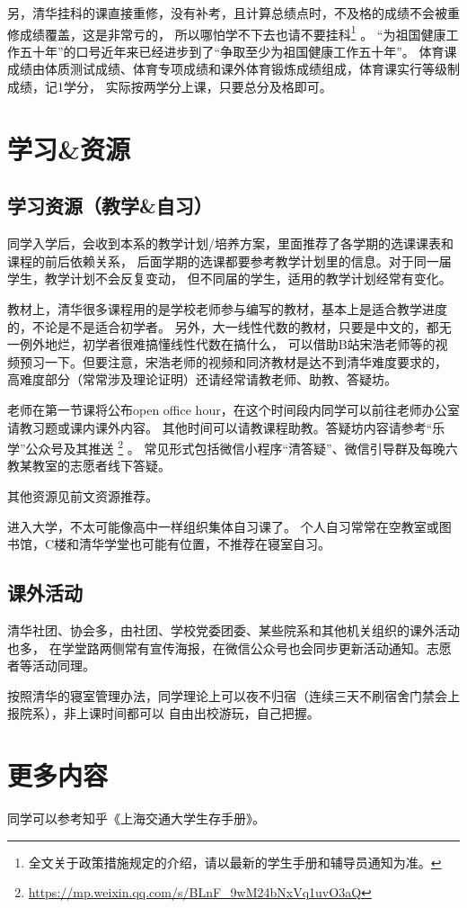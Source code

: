 \documentclass{article}
\begin{document}
另，清华挂科的课直接重修，没有补考，且计算总绩点时，不及格的成绩不会被重修成绩覆盖，这是非常亏的，
所以哪怕学不下去也请不要挂科\footnote{全文关于政策措施规定的介绍，请以最新的学生手册和辅导员通知为准。}
。
“为祖国健康工作五十年”的口号近年来已经进步到了“争取至少为祖国健康工作五十年”。
体育课成绩由体质测试成绩、体育专项成绩和课外体育锻炼成绩组成，体育课实行等级制成绩，记1学分，
实际按两学分上课，只要总分及格即可。

\section{学习\textnormal{\&}资源}
\subsection{学习资源（教学\textnormal{\&}自习）}
同学入学后，会收到本系的教学计划/培养方案，里面推荐了各学期的选课课表和课程的前后依赖关系，
后面学期的选课都要参考教学计划里的信息。对于同一届学生，教学计划不会反复变动，
但不同届的学生，适用的教学计划经常有变化。

教材上，清华很多课程用的是学校老师参与编写的教材，基本上是适合教学进度的，不论是不是适合初学者。
另外，大一线性代数的教材，只要是中文的，都无一例外地烂，初学者很难搞懂线性代数在搞什么，
可以借助B站宋浩老师等的视频预习一下。但要注意，宋浩老师的视频和同济教材是达不到清华难度要求的，
高难度部分（常常涉及理论证明）还请经常请教老师、助教、答疑坊。

老师在第一节课将公布open office hour，在这个时间段内同学可以前往老师办公室请教习题或课内课外内容。
其他时间可以请教课程助教。答疑坊内容请参考“乐学”公众号及其推送
\footnote{\url{https://mp.weixin.qq.com/s/BLnF_9wM24bNxVq1uvO3aQ}}
。
常见形式包括微信小程序“清答疑”、微信引导群及每晚六教某教室的志愿者线下答疑。

其他资源见前文资源推荐。

进入大学，不太可能像高中一样组织集体自习课了。
个人自习常常在空教室或图书馆，C楼和清华学堂也可能有位置，不推荐在寝室自习。

\subsection{课外活动}
清华社团、协会多，由社团、学校党委团委、某些院系和其他机关组织的课外活动也多，
在学堂路两侧常有宣传海报，在微信公众号也会同步更新活动通知。志愿者等活动同理。

按照清华的寝室管理办法，同学理论上可以夜不归宿（连续三天不刷宿舍门禁会上报院系），非上课时间都可以
自由出校游玩，自己把握。

\section{更多内容}
同学可以参考知乎《上海交通大学生存手册》。
\end{document}
